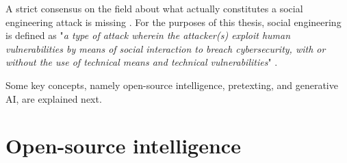 
A strict consensus on the field about what actually constitutes a social engineering attack is missing  \citep{hatfieldSocialEngineeringCybersecurity2018a}. For the purposes of this thesis, social engineering is defined as "\textit{a type of attack wherein the attacker(s) exploit human vulnerabilities by means of social interaction to breach cybersecurity, with or without the use of technical means and technical vulnerabilities}" \citep{wangDefiningSocialEngineering2020}.

Some key concepts, namely open-source intelligence, pretexting, and generative AI, are explained next.









\section{Open-source intelligence}
\begin{comment}

    - OSINT, sometimes written as OS-INT?
    - Data from publicly available resources
        - Company website
        - Social networking sites
        - Sites like archive.org and Google archives
        - Observing people in real life
    - Does not include calling the company and asking for information or any other forms of engagement
    - How modern AI augments OSINT gathering is analyzed in the last chapter
        - Exploration of how AI tools and techniques used for the automation and enhancement of OSINT processes
    - Stress the importance of OSINT within SE
    - Ethical considerations when it comes to OSINT
    - Some case studies highlighting the use of OSINT in real-world social engineering incidents?
    - Countermeasures will also be covered later
        - Strategies for companies to mitigate the risks associated with OSINT-based attacks
        - Integration of AI algorithms for analyzing and extracting valuable insights from OSINT data
        - Impact of AI-powered intelligence gathering of SE attacks
        
\end{comment}

